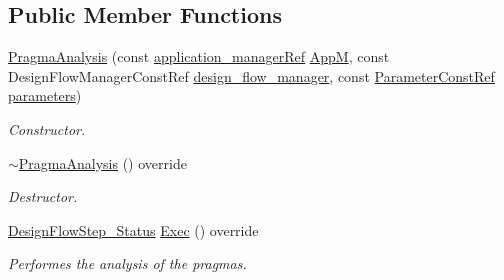 \subsection*{Public Member Functions}
\begin{DoxyCompactItemize}
\item 
\hyperlink{classPragmaAnalysis_ac24acf18f50521134b78d1663239498c}{Pragma\+Analysis} (const \hyperlink{application__manager_8hpp_a04ccad4e5ee401e8934306672082c180}{application\+\_\+manager\+Ref} \hyperlink{classFrontendFlowStep_a0ac0d8db2a378416583f51c4faa59d15}{AppM}, const Design\+Flow\+Manager\+Const\+Ref \hyperlink{classDesignFlowStep_ab770677ddf087613add30024e16a5554}{design\+\_\+flow\+\_\+manager}, const \hyperlink{Parameter_8hpp_a37841774a6fcb479b597fdf8955eb4ea}{Parameter\+Const\+Ref} \hyperlink{classDesignFlowStep_a802eaafe8013df706370679d1a436949}{parameters})
\begin{DoxyCompactList}\small\item\em Constructor. \end{DoxyCompactList}\item 
\hyperlink{classPragmaAnalysis_a552a49a96834beb7ad6439ad037a1fca}{$\sim$\+Pragma\+Analysis} () override
\begin{DoxyCompactList}\small\item\em Destructor. \end{DoxyCompactList}\item 
\hyperlink{design__flow__step_8hpp_afb1f0d73069c26076b8d31dbc8ebecdf}{Design\+Flow\+Step\+\_\+\+Status} \hyperlink{classPragmaAnalysis_a972bd7b68f27335d6fbf6e1d327c2663}{Exec} () override
\begin{DoxyCompactList}\small\item\em Performes the analysis of the pragmas. \end{DoxyCompactList}\end{DoxyCompactItemize}
